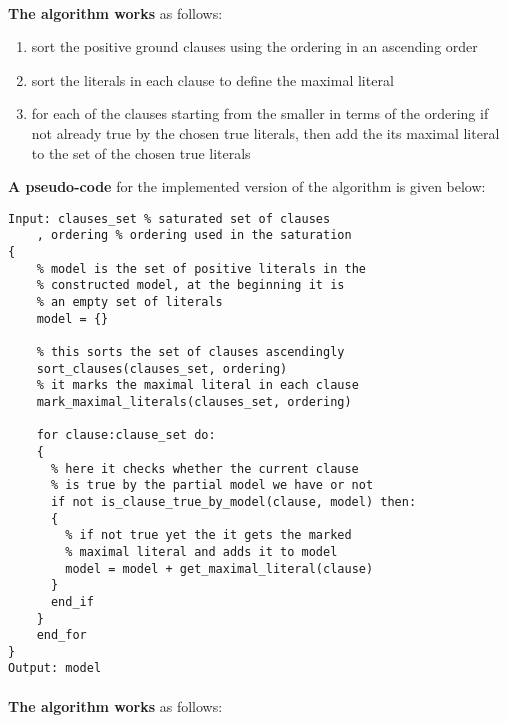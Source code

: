 		\paragraph{}
		\textbf{The algorithm works} as follows:
			
			\begin{enumerate}
				\item sort the positive ground clauses using the ordering in an ascending order
				\item sort the literals in each clause to define the maximal literal
				\item for each of the clauses starting from the smaller in terms of the ordering if not already true by the chosen true literals, then add the its maximal literal to the set of the chosen true literals 
			\end{enumerate}
		
		\textbf{A pseudo-code} for the implemented version of the algorithm is given below:
		
			\begin{minipage}{\textwidth}		
			\begin{lstlisting}[caption=Ground Positive Case for Bachmair and Ganzinger Model Construction,frame=single]
Input: clauses_set % saturated set of clauses
	, ordering % ordering used in the saturation
{	
	% model is the set of positive literals in the 
	% constructed model, at the beginning it is
	% an empty set of literals 
	model = {}			
				
	% this sorts the set of clauses ascendingly
	sort_clauses(clauses_set, ordering)  
	% it marks the maximal literal in each clause			
	mark_maximal_literals(clauses_set, ordering)
		
	for clause:clause_set do:
	{
	  % here it checks whether the current clause
	  % is true by the partial model we have or not
	  if not is_clause_true_by_model(clause, model) then:
	  {
		% if not true yet the it gets the marked
		% maximal literal and adds it to model											
		model = model + get_maximal_literal(clause)				
	  }
	  end_if
	}
	end_for						
}
Output: model
			\end{lstlisting}
			\end{minipage}		
		
		
		\paragraph{}
		\textbf{The algorithm works} as follows:
		
		
		
